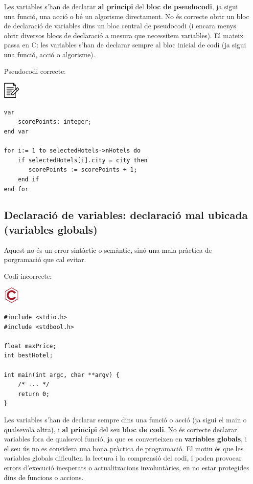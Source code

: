 \documentclass[
]{book}
\begin{document}
Les variables s'han de declarar \textbf{al principi} del \textbf{bloc de pseudocodi}, ja sigui una funció, una acció o bé un algorisme directament. No és correcte obrir un bloc de declaració de variables dins un bloc central de pseudocodi (i encara menys obrir diversos blocs de declaració a mesura que necessitem variables). El mateix passa en C: les variables s'han de declarar sempre al bloc inicial de codi (ja sigui una funció, acció o algorisme).

Pseudocodi correcte:

\includegraphics{./img/alg.png}

\begin{verbatim}
var
    scorePoints: integer;
end var

for i:= 1 to selectedHotels->nHotels do 
    if selectedHotels[i].city = city then 
       scorePoints := scorePoints + 1;  
    end if
end for
\end{verbatim}

\hypertarget{declaraciuxf3-de-variables-declaraciuxf3-mal-ubicada-variables-globals}{%
\subsection{Declaració de variables: declaració mal ubicada (variables globals)}\label{declaraciuxf3-de-variables-declaraciuxf3-mal-ubicada-variables-globals}}

Aquest no és un error sintàctic o semàntic, sinó una mala pràctica de porgramació que cal evitar.

Codi incorrecte:

\includegraphics{./img/c_err.png}

\begin{verbatim}
#include <stdio.h>
#include <stdbool.h>

float maxPrice;
int bestHotel;

int main(int argc, char **argv) {
    /* ... */
    return 0;
}
\end{verbatim}

Les variables s'han de declarar sempre dins una funció o acció (ja sigui el main o qualsevola altra), i \textbf{al principi} del seu \textbf{bloc de codi}. No és correcte declarar variables fora de qualsevol funció, ja que es converteixen en \textbf{variables globals}, i el seu ús no es considera una bona pràctica de programació. El motiu és que les variables globals dificulten la lectura i la comprensió del codi, i poden provocar errors d'execució inesperats o actualitzacions involuntàries, en no estar protegides dins de funcions o accions.
\end{document}
